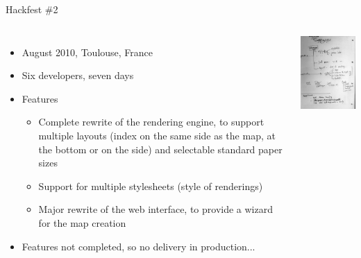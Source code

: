 \documentclass{beamer}
\begin{document}
\begin{frame}{Hackfest \#2}
  \begin{columns}
  \begin{itemize}
  \item August 2010, Toulouse, France
  \item Six developers, seven days
  \item Features
    \begin{itemize}
    \item Complete rewrite of the rendering engine, to support
      multiple layouts (index on the same side as the map, at the
      bottom or on the side) and selectable standard paper sizes
    \item Support for multiple stylesheets (style of renderings)
    \item Major rewrite of the web interface, to provide a wizard for
      the map creation
    \end{itemize}
  \item Features not completed, so no delivery in production...
  \end{itemize}
  \includegraphics[height=0.5\textheight]{hackfest-2-notes.jpg}
  \end{columns}
\end{frame}
\end{document}
